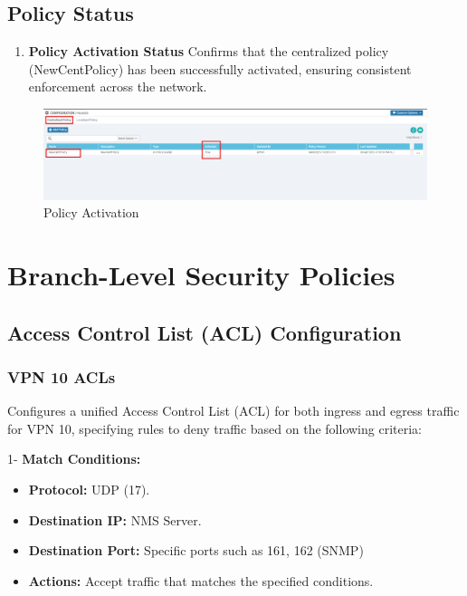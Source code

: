 \documentclass[12pt,english]{report}
\begin{document}
\subsection{Policy Status}
\begin{enumerate}
\item \textbf{Policy Activation Status}
Confirms that the centralized policy (NewCentPolicy) has been successfully activated, ensuring consistent enforcement across the network.
\end{enumerate}
\begin{figure}[H]
    \centering
    \includegraphics[width= 1 \textwidth]{chapitre 3/template/centpol.png}
    \caption{Policy Activation}
    \label{Policy Activation}
\end{figure}
\newpage
\section{Branch-Level Security Policies}
\subsection{Access Control List (ACL) Configuration}

\subsubsection{VPN 10 ACLs}
Configures a unified Access Control List (ACL) for both ingress and egress traffic for VPN 10, specifying rules to deny traffic based on the following criteria:

1- \textbf{Match Conditions:}
    
\begin{itemize}
    \item \textbf{Protocol:} UDP (17).
    \item \textbf{Destination IP:} NMS Server.
    \item \textbf{Destination Port:} Specific ports such as 161, 162 (SNMP)
    \item \textbf{Actions:} Accept traffic that matches the specified conditions.
\end{itemize}
\end{document}
